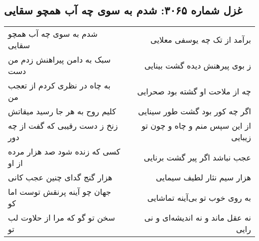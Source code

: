 \begin{center}
\section*{غزل شماره ۳۰۶۵: شدم به سوی چه آب همچو سقایی}
\label{sec:3065}
\begin{longtable}{l p{0.5cm} r}
شدم به سوی چه آب همچو سقایی
&&
برآمد از تک چه یوسفی معلایی
\\
سبک به دامن پیراهنش زدم من دست
&&
ز بوی پیرهنش دیده گشت بینایی
\\
به چاه در نظری کردم از تعجب من
&&
چه از ملاحت او گشته بود صحرایی
\\
کلیم روح به هر جا رسید میقاتش
&&
اگر چه کور بود گشت طور سینایی
\\
زنخ ز دست رقیبی که گفت از چه دور
&&
از این سپس منم و چاه و چون تو زیبایی
\\
کسی که زنده شود صد هزار مرده از او
&&
عجب نباشد اگر پیر گشت برنایی
\\
هزار گنج گدای چنین عجب کانی
&&
هزار سیم نثار لطیف سیمایی
\\
جهان چو آینه پرنقش توست اما کو
&&
به روی خوب تو بی‌آینه تماشایی
\\
سخن تو گو که مرا از حلاوت لب تو
&&
نه عقل ماند و نه اندیشه‌ای و نی رایی
\\
\end{longtable}
\end{center}
